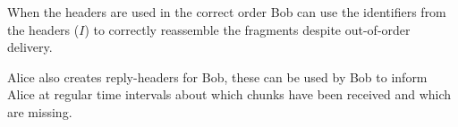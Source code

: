 When the headers are used in the correct order Bob can use the identifiers from 
the headers (\(I\)) to correctly reassemble the fragments despite out-of-order 
delivery.

Alice also creates reply-headers for Bob, these can be used by Bob to inform 
Alice at regular time intervals about which chunks have been received and which 
are missing.

